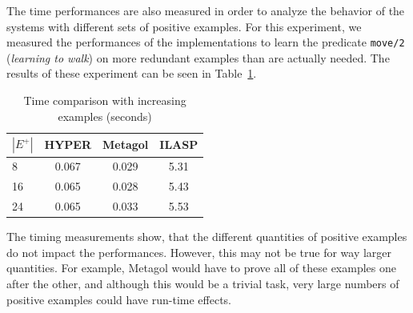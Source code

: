 The time performances are also measured in order to analyze the behavior of the systems with different sets of positive examples.
For this experiment, we measured the performances of the implementations to learn the predicate \texttt{move/2} (\emph{learning to walk}) on more redundant examples than are actually needed.
The results of these experiment can be seen in Table~\ref{tab:ex_cmp}.
{
\begin{center}
    \begin{table}[h]
    \centering
    \begin{tabular}{ |l|c|c|c| } 
        \hline
        \(|E^+|\) & \textbf{HYPER} & \textbf{Metagol} & \textbf{ILASP} \\ \hline
        8 & 0.067 & 0.029 & 5.31 \\ 
        16 & 0.065 & 0.028 & 5.43 \\
        24 & 0.065 & 0.033 & 5.53 \\  
        \hline
    \end{tabular}
    \caption{\label{tab:ex_cmp}Time comparison with increasing examples (seconds)}
\end{table}
\end{center}
}
The timing measurements show, that the different quantities of positive examples do not impact the performances. However, this may not be true for way larger
quantities. 
For example, Metagol would have to prove all of these examples one after the other, and although this would be a trivial task, very large numbers of positive examples could have run-time effects.

